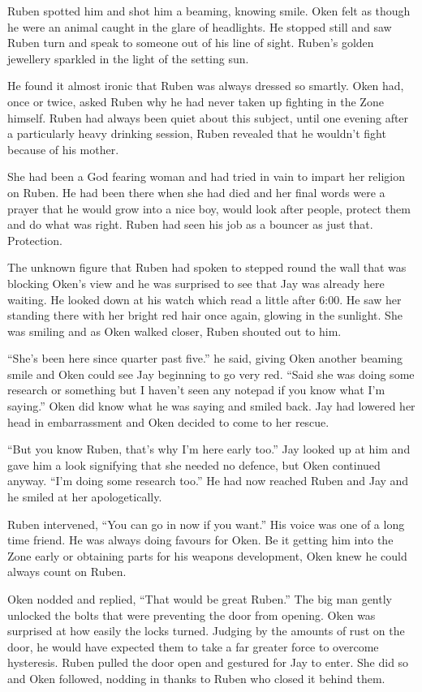 Ruben spotted him and shot him a beaming, knowing smile.  Oken felt as though he were an animal caught in the glare of headlights.  He stopped still and saw Ruben turn and speak to someone out of his line of sight.  Ruben's golden jewellery sparkled in the light of the setting sun.  

He found it almost ironic that Ruben was always dressed so smartly.  Oken had, once or twice, asked Ruben why he had never taken up fighting in the Zone himself.  Ruben had always been quiet about this subject, until one evening after a particularly heavy drinking session, Ruben revealed that he wouldn't fight because of his mother.  

She had been a God fearing woman and had tried in vain to impart her religion on Ruben.  He had been there when she had died and her final words were a prayer that he would grow into a nice boy, would look after people, protect them and do what was right.  Ruben had seen his job as a bouncer as just that.  Protection.

The unknown figure that Ruben had spoken to stepped round the wall that was blocking Oken's view and he was surprised to see that Jay was already here waiting.  He looked down at his watch which read a little after 6:00.  He saw her standing there with her bright red hair once again, glowing in the sunlight.  She was smiling and as Oken walked closer, Ruben shouted out to him.

``She's been here since quarter past five.'' he said, giving Oken another beaming smile and Oken could see Jay beginning to go very red.  ``Said she was doing some research or something but I haven't seen any notepad if you know what I'm saying.''  Oken did know what he was saying and smiled back.  Jay had lowered her head in embarrassment and Oken decided to come to her rescue.

``But you know Ruben, that's why I'm here early too.''  Jay looked up at him and gave him a look signifying that she needed no defence, but Oken continued anyway.  ``I'm doing some research too.''  He had now reached Ruben and Jay and he smiled at her apologetically.  

Ruben intervened, ``You can go in now if you want.''  His voice was one of a long time friend.  He was always doing favours for Oken.  Be it getting him into the Zone early or obtaining parts for his weapons development, Oken knew he could always count on Ruben.  

Oken nodded and replied, ``That would be great Ruben.''  The big man gently unlocked the bolts that were preventing the door from opening.  Oken was surprised at how easily the locks turned.  Judging by the amounts of rust on the door, he would have expected them to take a far greater force to overcome hysteresis.  Ruben pulled the door open and gestured for Jay to enter.  She did so and Oken followed, nodding in thanks to Ruben who closed it behind them.

